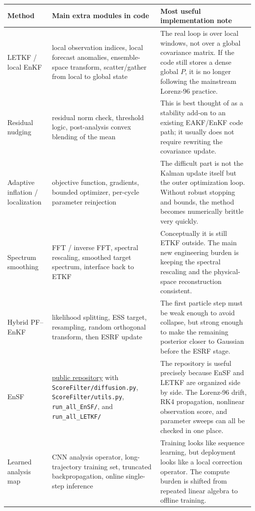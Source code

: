\documentclass[12pt,a4paper]{article}
\begin{document}
\begin{longtable}{>{\raggedright\arraybackslash}p{3.1cm} >{\raggedright\arraybackslash}p{3.8cm} >{\raggedright\arraybackslash}p{6.5cm}}
\toprule
Method & Main extra modules in code & Most useful implementation note \\
\midrule
\endhead
LETKF / local EnKF & local observation indices, local forecast anomalies, ensemble-space transform, scatter/gather from local to global state & The real loop is over local windows, not over a global covariance matrix. If the code still stores a dense global \(P\), it is no longer following the mainstream Lorenz-96 practice. \\
Residual nudging & residual norm check, threshold logic, post-analysis convex blending of the mean & This is best thought of as a stability add-on to an existing EAKF/EnKF code path; it usually does not require rewriting the covariance update. \\
Adaptive inflation / localization & objective function, gradients, bounded optimizer, per-cycle parameter reinjection & The difficult part is not the Kalman update itself but the outer optimization loop. Without robust stopping and bounds, the method becomes numerically brittle very quickly. \\
Spectrum smoothing & FFT / inverse FFT, spectral rescaling, smoothed target spectrum, interface back to ETKF & Conceptually it is still ETKF outside. The main new engineering burden is keeping the spectral rescaling and the physical-space reconstruction consistent. \\
Hybrid PF--EnKF & likelihood splitting, ESS target, resampling, random orthogonal transform, then ESRF update & The first particle step must be weak enough to avoid collapse, but strong enough to make the remaining posterior closer to Gaussian before the ESRF stage. \\
EnSF & \href{https://github.com/zezhongzhang/EnSF}{public repository} with \texttt{ScoreFilter/diffusion.py}, \texttt{ScoreFilter/utils.py}, \texttt{run\_all\_EnSF/}, and \texttt{run\_all\_LETKF/} & The repository is useful precisely because EnSF and LETKF are organized side by side. The Lorenz-96 drift, RK4 propagation, nonlinear observation score, and parameter sweeps can all be checked in one place. \\
Learned analysis map & CNN analysis operator, long-trajectory training set, truncated backpropagation, online single-step inference & Training looks like sequence learning, but deployment looks like a local correction operator. The compute burden is shifted from repeated linear algebra to offline training. \\
\bottomrule
\end{longtable}
\end{document}
